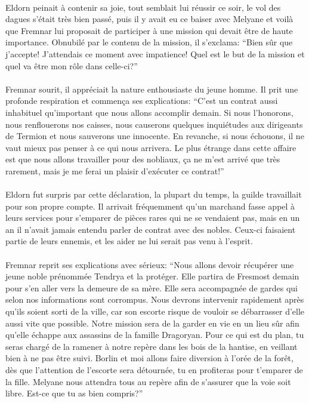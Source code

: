 \paragraph{}
Eldorn peinait à contenir sa joie, tout semblait lui réussir ce soir, le vol
des dagues s'était très bien passé, puis il y avait eu ce baiser avec Melyane
et voilà que Fremnar lui proposait de participer à une mission qui devait être
de haute importance. Obnubilé par le contenu de la mission, il s'exclama:
``Bien sûr que j'accepte! J'attendais ce moment avec impatience! Quel est le
but de la mission et quel va être mon rôle dans celle-ci?''

\paragraph{}
Fremnar sourit, il appréciait la nature enthousiaste du jeune homme. Il prit
une profonde respiration et commença ses explications: ``C'est un contrat
aussi inhabituel qu'important que nous allons accomplir demain. Si nous
l'honorons, nous renflouerons nos caisses, nous causerons quelques inquiétudes
aux dirigeants de Termion et nous sauverons une innocente. En revanche, si
nous échouons, il ne vaut mieux pas penser à ce qui nous arrivera. Le plus
étrange dans cette affaire est que nous allons travailler pour des nobliaux,
ça ne m'est arrivé que très rarement, mais je me ferai un plaisir d'exécuter
ce contrat!''

\paragraph{}
Eldorn fut surpris par cette déclaration, la plupart du temps, la guilde
travaillait pour son propre compte. Il arrivait fréquemment qu'un marchand
fasse appel à leurs services pour s'emparer de pièces rares qui ne se
vendaient pas, mais en un an il n'avait jamais entendu parler de contrat avec
des nobles. Ceux-ci faisaient partie de leurs ennemis, et les aider ne lui
serait pas venu à l'esprit.

\paragraph{}
Fremnar reprit ses explications avec sérieux: ``Nous allons devoir récupérer
une jeune noble prénommée Tendrya et la protéger. Elle partira de Fresmost
demain pour s'en aller vers la demeure de sa mère. Elle sera accompagnée de
gardes qui selon nos informations sont corrompus. Nous devrons intervenir
rapidement après qu'ils soient sorti de la ville, car son escorte risque de
vouloir se débarrasser d'elle aussi vite que possible. Notre mission sera de la
garder en vie en un lieu sûr afin qu'elle échappe aux assassins de la famille
Dragoryan. Pour ce qui est du plan, tu seras chargé de la ramener à notre
repère dans les bois de la hantise, en veillant bien à ne pas être suivi.
Borlin et moi allons faire diversion à l'orée de la forêt, dès que l'attention
de l'escorte sera détournée, tu en profiteras pour t'emparer de la fille.
Melyane nous attendra tous au repère afin de s'assurer que la voie soit
libre. Est-ce que tu as bien compris?''

